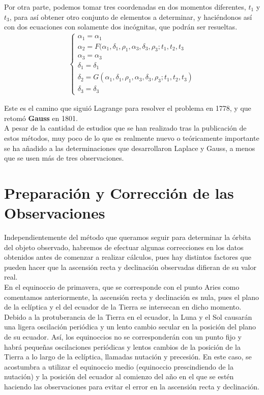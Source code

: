 \documentclass[11pt]{article}
\begin{document}
Por otra parte, podemos tomar tres coordenadas en dos momentos diferentes, $t_1$ y $t_3$, para así obtener otro conjunto de elementos a determinar, y haciéndonos así con dos ecuaciones con solamente dos incógnitas, que podrán ser resueltas.
\begin{align}
\left\{\begin{array}{l}
	\alpha_1 = \alpha_1\\
	\alpha_2 = F(\alpha_1, \delta_1, \rho_1, \alpha_3, \delta_3, \rho_3; t_1, t_2, t_3\\
	\alpha_3 = \alpha_3\\
	\delta_1 = \delta_1\\
	\delta_2 = G(\alpha_1, \delta_1, \rho_1, \alpha_3, \delta_3, \rho_3; t_1, t_2, t_3)\\
	\delta_3 = \delta_3
\end{array}
\right.
\label{eq:camino_gauss}
\end{align}

Este es el camino que siguió Lagrange para resolver el problema en 1778, y que retomó \textbf{Gauss} en 1801.\\

A pesar de la cantidad de estudios que se han realizado tras la publicación de estos métodos, muy poco de lo que es realmente nuevo o teóricamente importante se ha añadido a las determinaciones que desarrollaron Laplace y Gauss, a menos que se usen más de tres observaciones.\\


\section{Preparación y Corrección de las Observaciones}
Independientemente del método que queramos seguir para determinar la órbita del objeto observado, habremos de efectuar algunas correcciones en los datos obtenidos antes de comenzar a realizar cálculos, pues hay distintos factores que pueden hacer que la ascensión recta y declinación observadas difieran de su valor real.\\

En el equinoccio de primavera, que se corresponde con el punto Aries como comentamos anteriormente, la ascensión recta y declinación es nula, pues el plano de la eclíptica y el del ecuador de la Tierra se intersecan en dicho momento. Debido a la protuberancia de la Tierra en el ecuador, la Luna y el Sol causarán una ligera oscilación periódica y un lento cambio secular en la posición del plano de su ecuador. Así, los equinoccios no se corresponderán con un punto fijo y habrá pequeñas oscilaciones periódicas y lentos cambios de la posición de la Tierra a lo largo de la eclíptica, llamadas nutación y precesión. En este caso, se acostumbra a utilizar el equinoccio medio (equinoccio prescindiendo de la nutación) y la posición del ecuador al comienzo del año en el que se estén haciendo las observaciones para evitar el error en la ascensión recta y declinación.\\
\end{document}
